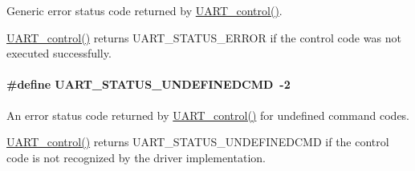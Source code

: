 Generic error status code returned by \hyperlink{_u_a_r_t_8h_a9de3c26cfe4ce6b7f350a6ea6e16801d}{U\+A\+R\+T\+\_\+control()}. 

\hyperlink{_u_a_r_t_8h_a9de3c26cfe4ce6b7f350a6ea6e16801d}{U\+A\+R\+T\+\_\+control()} returns U\+A\+R\+T\+\_\+\+S\+T\+A\+T\+U\+S\+\_\+\+E\+R\+R\+O\+R if the control code was not executed successfully. 
\paragraph[{U\+A\+R\+T\+\_\+\+S\+T\+A\+T\+U\+S\+\_\+\+U\+N\+D\+E\+F\+I\+N\+E\+D\+C\+M\+D}]{\setlength{\rightskip}{0pt plus 5cm}\#define U\+A\+R\+T\+\_\+\+S\+T\+A\+T\+U\+S\+\_\+\+U\+N\+D\+E\+F\+I\+N\+E\+D\+C\+M\+D~-\/2}\label{group___u_a_r_t___s_t_a_t_u_s_ga61125a2eb8059fd8b96ad95edc68ac2b}


An error status code returned by \hyperlink{_u_a_r_t_8h_a9de3c26cfe4ce6b7f350a6ea6e16801d}{U\+A\+R\+T\+\_\+control()} for undefined command codes. 

\hyperlink{_u_a_r_t_8h_a9de3c26cfe4ce6b7f350a6ea6e16801d}{U\+A\+R\+T\+\_\+control()} returns U\+A\+R\+T\+\_\+\+S\+T\+A\+T\+U\+S\+\_\+\+U\+N\+D\+E\+F\+I\+N\+E\+D\+C\+M\+D if the control code is not recognized by the driver implementation. 
